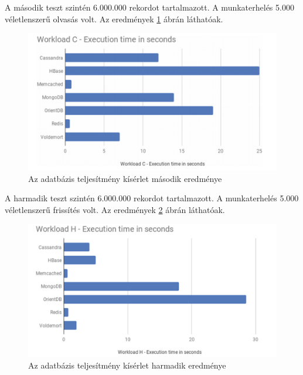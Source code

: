 	A második teszt szintén 6.000.000 rekordot tartalmazott. A munkaterhelés 5.000 véletlenszerű olvasás volt. Az eredmények \ref{fig:performance_b} ábrán láthatóak.
	
	\begin{figure}
		\centering
		\includegraphics[scale=0.6]{figures/images/performance_b.png}
		\caption{Az adatbázis teljesítmény kísérlet második eredménye \cite{martins2019study}}
		\label{fig:performance_b}
	\end{figure}
	
	A harmadik teszt szintén 6.000.000 rekordot tartalmazott. A munkaterhelés 5.000 véletlenszerű frissítés volt. Az eredmények \ref{fig:performance_c} ábrán láthatóak.
	
	\begin{figure}
		\centering
		\includegraphics[scale=0.6]{figures/images/performance_c.png}
		\caption{Az adatbázis teljesítmény kísérlet harmadik eredménye \cite{martins2019study}}
		\label{fig:performance_c}
	\end{figure}